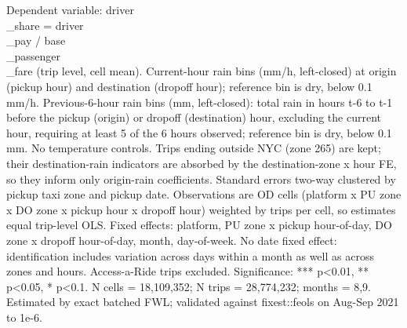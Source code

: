 \par \raggedright 
Dependent variable: driver\\_share = driver\\_pay / base\\_passenger\\_fare (trip level, cell mean). Current-hour rain bins (mm/h, left-closed) at origin (pickup hour) and destination (dropoff hour); reference bin is dry, below 0.1 mm/h. Previous-6-hour rain bins (mm, left-closed): total rain in hours t-6 to t-1 before the pickup (origin) or dropoff (destination) hour, excluding the current hour, requiring at least 5 of the 6 hours observed; reference bin is dry, below 0.1 mm. No temperature controls. Trips ending outside NYC (zone 265) are kept; their destination-rain indicators are absorbed by the destination-zone x hour FE, so they inform only origin-rain coefficients. Standard errors two-way clustered by pickup taxi zone and pickup date. Observations are OD cells (platform x PU zone x DO zone x pickup hour x dropoff hour) weighted by trips per cell, so estimates equal trip-level OLS. Fixed effects: platform, PU zone x pickup hour-of-day, DO zone x dropoff hour-of-day, month, day-of-week. No date fixed effect: identification includes variation across days within a month as well as across zones and hours. Access-a-Ride trips excluded. Significance: *** p<0.01, ** p<0.05, * p<0.1. N cells = 18,109,352; N trips = 28,774,232; months = 8,9. Estimated by exact batched FWL; validated against fixest::feols on Aug-Sep 2021 to 1e-6.
\par\endgroup
\ifdefined\ifclassloaded
{}
\fi
